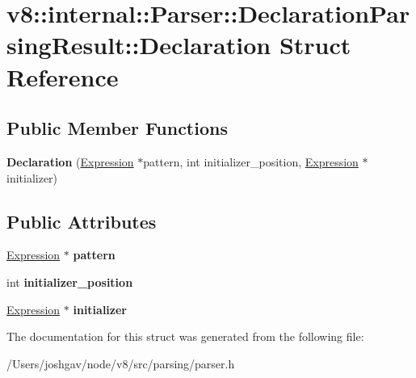 \hypertarget{structv8_1_1internal_1_1_parser_1_1_declaration_parsing_result_1_1_declaration}{}\section{v8\+:\+:internal\+:\+:Parser\+:\+:Declaration\+Parsing\+Result\+:\+:Declaration Struct Reference}
\label{structv8_1_1internal_1_1_parser_1_1_declaration_parsing_result_1_1_declaration}
\subsection*{Public Member Functions}
\begin{DoxyCompactItemize}
\item 
{\bfseries Declaration} (\hyperlink{classv8_1_1internal_1_1_expression}{Expression} $\ast$pattern, int initializer\+\_\+position, \hyperlink{classv8_1_1internal_1_1_expression}{Expression} $\ast$initializer)\hypertarget{structv8_1_1internal_1_1_parser_1_1_declaration_parsing_result_1_1_declaration_acdc94844adb6eec10ce66b6491c881d5}{}\label{structv8_1_1internal_1_1_parser_1_1_declaration_parsing_result_1_1_declaration_acdc94844adb6eec10ce66b6491c881d5}

\end{DoxyCompactItemize}
\subsection*{Public Attributes}
\begin{DoxyCompactItemize}
\item 
\hyperlink{classv8_1_1internal_1_1_expression}{Expression} $\ast$ {\bfseries pattern}\hypertarget{structv8_1_1internal_1_1_parser_1_1_declaration_parsing_result_1_1_declaration_a7a262163306b5d2cba060a432bc5a488}{}\label{structv8_1_1internal_1_1_parser_1_1_declaration_parsing_result_1_1_declaration_a7a262163306b5d2cba060a432bc5a488}

\item 
int {\bfseries initializer\+\_\+position}\hypertarget{structv8_1_1internal_1_1_parser_1_1_declaration_parsing_result_1_1_declaration_afef7619b3d2209c3840bf667b4aa7f2b}{}\label{structv8_1_1internal_1_1_parser_1_1_declaration_parsing_result_1_1_declaration_afef7619b3d2209c3840bf667b4aa7f2b}

\item 
\hyperlink{classv8_1_1internal_1_1_expression}{Expression} $\ast$ {\bfseries initializer}\hypertarget{structv8_1_1internal_1_1_parser_1_1_declaration_parsing_result_1_1_declaration_ab419721e1bfc4ff10df12905bd8bf574}{}\label{structv8_1_1internal_1_1_parser_1_1_declaration_parsing_result_1_1_declaration_ab419721e1bfc4ff10df12905bd8bf574}

\end{DoxyCompactItemize}


The documentation for this struct was generated from the following file\+:\begin{DoxyCompactItemize}
\item 
/\+Users/joshgav/node/v8/src/parsing/parser.\+h\end{DoxyCompactItemize}
